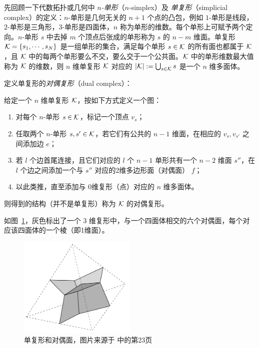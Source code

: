 		先回顾一下代数拓扑或几何中 \emph{$n$-单形}（$n$-simplex）及 \emph{单复形}（simplicial complex）的定义：$n$-单形是几何无关的 $n+1$ 个点的凸包，例如 $1$-单形是线段，$2$-单形是三角形，$3$-单形是四面体，$n$ 称为单形的维数。每个单形上可赋予两个定向。$n$-单形 $s$ 中去掉 $m$ 个顶点后张成的单形称为 $s$ 的 $n-m$ 维面。单复形 $\mathcal{K} = \left\{ s_1, \cdots, s_N \right\}$ 是一组单形的集合，满足每个单形 $s\in \mathcal{K}$ 的所有面也都属于 $\mathcal{K}$，且 $\mathcal{K}$ 中的每两个单形要么不交，要么交于一个公共面。$\mathcal{K}$ 中的单形维数最大值称为 $\mathcal{K}$ 的维数，则 $n$ 维单复形 $\mathcal{K}$ 对应的 $\abs{\mathcal{K}} := \bigcup_{s\in \mathcal{K}} s$ 是一个 $n$ 维多面体。

		定义单复形的\emph{对偶复形}（dual complex）：
		\begin{Definition}
			给定一个 $n$ 维单复形 $\mathcal{K}$，按如下方式定义一个图：
			\begin{enumerate}
				\item 对每个 $n$-单形 $s\in \mathcal{K}$，标记一个顶点 $v_s$；
				\item 任取两个 $n$-单形 $s,s' \in \mathcal{K}$，若它们有公共的 $n-1$ 维面，在相应的 $v_s,v_{s'}$ 之间添加边 $e$；
				\item 若 $l$ 个边首尾连接，且它们对应的 $l$ 个 $n-1$ 单形共有一个 $n-2$ 维面 $s''$，在 $l$ 个边之间添加一个与 $s''$ 对应的2维多边形面（对偶面） $f$；
				\item 以此类推，直至添加与 0维复形（点）对应的 $n$ 维多面体。
			\end{enumerate}
			则得到的结构（并不是单复形）称为 $\mathcal{K}$ 的对偶复形。
		\end{Definition}
		如图~\ref{pic-dual_face}，灰色标出了一个 $3$ 维复形中，与一个四面体相交的六个对偶面，每个对应该四面体的一个棱（即1维面）。
		\begin{figure}[htbp]
			\centering
			\includegraphics[width=0.5\textwidth]{figures/dual_face.png}
			\caption[单复形和对偶面]{单复形和对偶面，图片来源于\cite{Baez1999} 中的第23页}\label{pic-dual_face}
		\end{figure}

